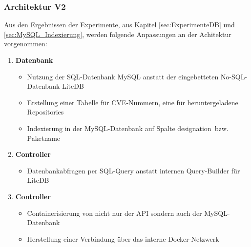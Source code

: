 \subsubsection{Architektur V2} \label{sec:ArchitekturV2}
    Aus den Ergebnissen der Experimente, aus Kapitel \ref{sec:ExperimenteDB} und \ref{sec:MySQL_Indexierung}, werden folgende Anpassungen an der Achitektur vorgenommen:
    \begin{enumerate}
        \item \textbf{Datenbank}
            \begin{itemize}
                \item Nutzung der SQL-Datenbank MySQL anstatt der eingebetteten No-SQL-Datenbank LiteDB
                \item Erstellung einer Tabelle für \ac{CVE}-Nummern, eine für heruntergeladene Repositories
                \item Indexierung in der MySQL-Datenbank auf Spalte \glqq designation\grqq~bzw. Paketname
            \end{itemize}
        \item \textbf{Controller}
            \begin{itemize}
                \item Datenbankabfragen per SQL-Query anstatt internen Query-Builder für LiteDB
            \end{itemize}
        \item \textbf{Controller}
            \begin{itemize}
                \item Containerisierung von nicht nur der \ac{API} sondern auch der MySQL-Datenbank
                \item Herstellung einer Verbindung über das interne Docker-Netzwerk
            \end{itemize}
    \end{enumerate}